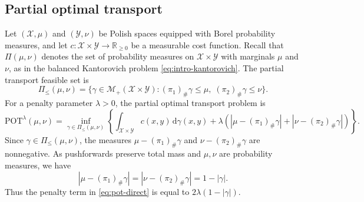 \documentclass[a4paper,11pt]{article}
\numberwithin{equation}{section}
\newcommand{\RR}{\mathbb{R}}
\newcommand{\MM}{\mathcal{M}}
\newcommand{\POT}{\mathrm{POT}}
\newcommand{\dd}{\,\mathrm{d}}
\newcommand{\X}{\mathcal{X}}
\newcommand{\Y}{\mathcal{Y}}
\begin{document}
\subsection{Partial optimal transport}\label{subsec:pot}

Let $(\X,\mu)$ and $(\Y,\nu)$ be Polish spaces equipped with Borel probability measures, and let $c:\X\times\Y\to\RR_{\geq 0}$ be a measurable cost function. Recall that $\Pi(\mu,\nu)$ denotes the set of probability measures on $\X\times\Y$ with marginals $\mu$ and $\nu$, as in the balanced Kantorovich problem \eqref{eq:intro-kantorovich}. The partial transport feasible set is
\begin{equation*}
  \Pi_{ \leq }(\mu,\nu) = \{\gamma \in \MM_+(\X\times\Y): (\pi_1)_\#\gamma \leq \mu,\; (\pi_2)_\#\gamma \leq \nu\}.
\end{equation*}
For a penalty parameter $\lambda > 0$, the partial optimal transport problem is
\begin{equation}\label{eq:pot-direct}
  \POT^{\lambda}(\mu,\nu) = \inf_{\gamma \in \Pi_{ \leq }(\mu,\nu)} \left\{\int_{\X\times\Y} c(x,y)\dd\gamma(x,y) + \lambda\left(|\mu-(\pi_1)_\#\gamma| + |\nu-(\pi_2)_\#\gamma|\right)\right\}.
\end{equation}
Since $\gamma \in \Pi_{\leq}(\mu,\nu)$, the measures
$\mu-(\pi_1)_\#\gamma$ and $\nu-(\pi_2)_\#\gamma$ are nonnegative.
As pushforwards preserve total mass and $\mu,\nu$ are probability measures, we have
\begin{equation*}
  |\mu-(\pi_1)_\#\gamma| = |\nu-(\pi_2)_\#\gamma| = 1-|\gamma|.
\end{equation*}
Thus the penalty term in \eqref{eq:pot-direct} is equal to $2\lambda(1-|\gamma|)$.
\end{document}
